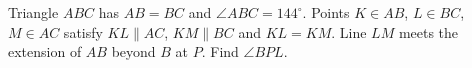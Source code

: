 Triangle $ABC$ has $AB=BC$ and $\angle ABC=144^\circ$. Points $K\in AB$, $L\in BC$, $M\in AC$ satisfy $KL\parallel AC$, $KM\parallel BC$ and $KL=KM$. Line $LM$ meets the extension of $AB$ beyond $B$ at $P$. Find $\angle BPL$.
